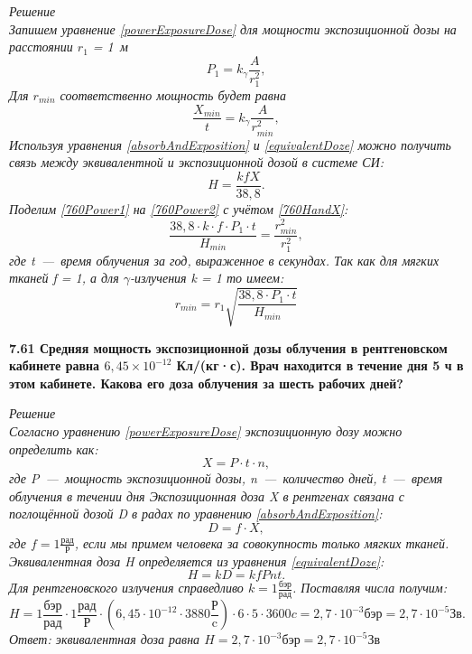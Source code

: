 \documentclass[a4paper, fontsize=14pt]{extreport}
\begin{document}
{\textit{Решение \\
%
Запишем уравнение \ref{powerExposureDose} для мощности экспозиционной дозы на расстоянии $r_1$ = 1~м
\begin{equation} \label{760Power1}
  P_1 = k_\gamma \frac{A}{r_1^2},
\end{equation}
Для $r_{min}$ соответственно мощность будет равна
\begin{equation} \label{760Power2}
  \frac{X_{min}}{t} = k_\gamma \frac{A}{r_{min}^2},
\end{equation}
Используя уравнения \ref{absorbAndExposition} и  \ref{equivalentDoze} можно получить связь между эквивалентной и экспозиционной дозой в системе СИ:
\begin{equation} \label{760HandX}
  H = \frac{kfX}{38,8}.
\end{equation}
Поделим \ref{760Power1} на \ref{760Power2} с учётом \ref{760HandX}:
\begin{equation}
  \frac{38,8\cdot k \cdot f \cdot P_1\cdot t}{H_{min}} = \frac{r_{min}^2}{r_1^2},
\end{equation}
где t~---~время облучения за год, выраженное в секундах. Так как для мягких тканей f = 1, а для $\gamma$-излучения k = 1 то имеем:
\begin{equation}
  r_{min} = r_1 \sqrt{\frac{38,8 \cdot P_1 \cdot t}{H_{min}}}
\end{equation}
}

\textbf{7.61 Средняя мощность экспозиционной дозы облучения в рентгеновском кабинете равна $6,45 \times 10^{-12}$ Кл/(кг·с). Врач находится в течение дня 5 ч в этом кабинете. Какова его доза облучения за шесть рабочих дней?}

\textit{Решение \\
%
Согласно уравнению \ref{powerExposureDose} экспозиционную дозу можно определить как:
\begin{equation}
  X = P\cdot t \cdot n,
\end{equation}
где P~---~мощность экспозиционной дозы, n~---~количество дней, t~---~время облучения в течении дня
Экспозиционная доза X в рентгенах связана с поглощённой дозой D в радах по уравнению \ref{absorbAndExposition}: 
\begin{equation}
  D = f \cdot X,
\end{equation}  
где $f = 1 \frac{\text{рад}}{\text{Р}}$, если мы примем человека за совокупность только мягких  тканей. Эквивалентная доза H определяется из уравнения \ref{equivalentDoze}:
\begin{equation}
  H = kD = k f P n t.
\end{equation}   
Для рентгеновского излучения справедливо $k = 1 \frac{\text{бэр}}{\text{рад}}$.
Поставляя числа получим: 
\begin{equation}
  H =  1 \frac{\text{бэр}}{\text{рад}} \cdot 1 \frac{\text{рад}}{\text{Р}} \cdot \left ( 6,45 \cdot 10^{-12} \cdot 3880\frac{\text{Р}}{\text{c}} \right ) \cdot 6 \cdot 5 \cdot 3600c = 2,7 \cdot 10^{-3} \text{бэр} =  2,7 \cdot 10^{-5} \text{Зв}.
\end{equation}
Ответ: эквивалентная доза равна $H = 2,7 \cdot 10^{-3} \text{бэр} =  2,7 \cdot 10^{-5} \text{Зв}$}

}
\end{document}
